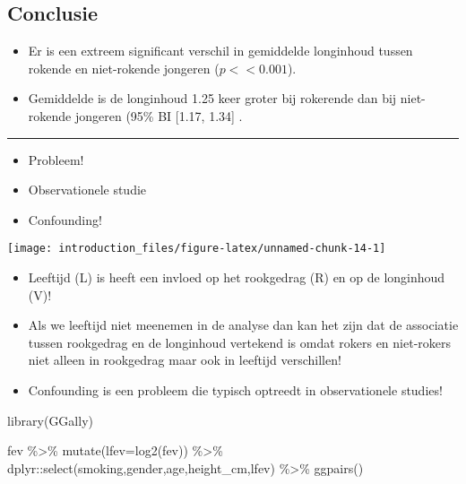 \documentclass[
]{article}
\newenvironment{Shaded}{\begin{snugshade}}{\end{snugshade}}
\newcommand{\AttributeTok}[1]{\textcolor[rgb]{0.77,0.63,0.00}{#1}}
\newcommand{\FunctionTok}[1]{\textcolor[rgb]{0.00,0.00,0.00}{#1}}
\newcommand{\NormalTok}[1]{#1}
\newcommand{\SpecialCharTok}[1]{\textcolor[rgb]{0.00,0.00,0.00}{#1}}
\providecommand{\tightlist}{%
  \setlength{\itemsep}{0pt}\setlength{\parskip}{0pt}}
\begin{document}
\hypertarget{conclusie}{%
\subsection{Conclusie}\label{conclusie}}

\begin{itemize}
\item
  Er is een extreem significant verschil in gemiddelde longinhoud tussen
  rokende en niet-rokende jongeren (\(p << 0.001\)).
\item
  Gemiddelde is de longinhoud 1.25 keer groter bij rokerende dan bij
  niet-rokende jongeren (95\% BI {[}1.17, 1.34{]} .
\end{itemize}

\begin{center}\rule{0.5\linewidth}{0.5pt}\end{center}

\begin{itemize}
\tightlist
\item
  Probleem!
\item
  Observationele studie
\item
  Confounding!
\end{itemize}

\begin{center}\texttt{[image: introduction\_files/figure-latex/unnamed-chunk-14-1]} \end{center}

\begin{itemize}
\tightlist
\item
  Leeftijd (L) is heeft een invloed op het rookgedrag (R) en op de
  longinhoud (V)!
\item
  Als we leeftijd niet meenemen in de analyse dan kan het zijn dat de
  associatie tussen rookgedrag en de longinhoud vertekend is omdat
  rokers en niet-rokers niet alleen in rookgedrag maar ook in leeftijd
  verschillen!
\item
  Confounding is een probleem die typisch optreedt in observationele
  studies!
\end{itemize}

\begin{Shaded}
\begin{Highlighting}[]
\FunctionTok{library}\NormalTok{(GGally)}

\NormalTok{fev }\SpecialCharTok{\%\textgreater{}\%} 
  \FunctionTok{mutate}\NormalTok{(}\AttributeTok{lfev=}\FunctionTok{log2}\NormalTok{(fev)) }\SpecialCharTok{\%\textgreater{}\%} 
\NormalTok{  dplyr}\SpecialCharTok{::}\FunctionTok{select}\NormalTok{(smoking,gender,age,height\_cm,lfev) }\SpecialCharTok{\%\textgreater{}\%} 
  \FunctionTok{ggpairs}\NormalTok{()}
\end{Highlighting}
\end{Shaded}
\end{document}
